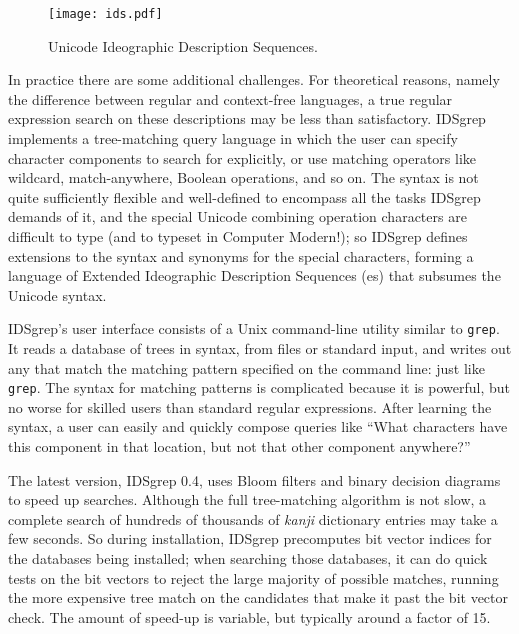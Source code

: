 \documentclass{ltugboat}
\begin{document}
\begin{figure}
\centering
\texttt{[image: ids.pdf]}
\caption{Unicode Ideographic Description Sequences.}
\label{fig:ids}
\end{figure}

In practice there are some additional challenges.  For theoretical reasons,
namely the difference between regular and context-free languages, a true
regular expression search on these descriptions may be less than
satisfactory.  IDSgrep implements a tree-matching query language in which
the user can specify character components to search for explicitly, or use
matching operators like wildcard, match-anywhere, Boolean operations, and so
on.  The  syntax is not quite sufficiently flexible and
well-defined to encompass all the tasks IDSgrep demands of it, and the
special Unicode combining operation characters are difficult to type (and to
typeset in Computer Modern!); so IDSgrep defines extensions to the syntax
and  synonyms for the special characters,
forming a language of Extended Ideographic Description Sequences
(es) that subsumes the Unicode  syntax.

IDSgrep's user interface consists of a Unix command-line utility similar to
\verb|grep|.  It reads a database of trees in  syntax, from files
or standard input, and writes out any that match the matching pattern
specified on the command line:  just like \verb|grep|.  The syntax for
matching patterns is complicated because it is powerful, but no worse for
skilled users than standard regular expressions.  After learning the syntax,
a user can easily and quickly compose queries like ``What characters have
this component in that location, but not that other component anywhere?''

The latest version, IDSgrep 0.4, uses Bloom filters and binary decision
diagrams to speed up searches.  Although the full tree-matching algorithm is
not slow, a complete search of hundreds of thousands of \emph{kanji}
dictionary entries may take a few seconds.  So during installation, IDSgrep
precomputes bit vector indices for the databases being installed;
when searching those databases, it can do quick tests on the bit
vectors to reject the large majority of possible matches, running the more
expensive tree match on the candidates that make it past the bit vector
check.  The amount of speed-up is variable, but typically around a factor of
15.
\end{document}
